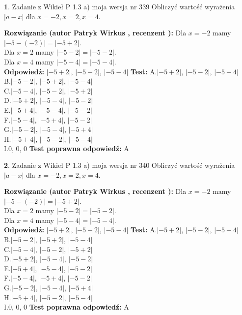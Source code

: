 \documentclass[12pt, a4paper]{article}
\theoremstyle{definition} %
\newtheorem{zad}{}
\newcommand{\zadStart}[1]{\begin{zad}#1\newline}
\newcommand{\zadStop}{\end{zad}}
\newcommand{\rozwStart}[2]{\noindent \textbf{Rozwiązanie (autor #1 , recenzent #2): }\newline}
\newcommand{\rozwStop}{\newline}
\newcommand{\odpStart}{\noindent \textbf{Odpowiedź:}\newline}
\newcommand{\odpStop}{\newline}
\newcommand{\testStart}{\noindent \textbf{Test:}\newline}
\newcommand{\testStop}{\newline}
\newcommand{\kluczStart}{\noindent \textbf{Test poprawna odpowiedź:}\newline}
\newcommand{\kluczStop}{\newline}
\begin{document}
\zadStart{Zadanie z Wikieł P 1.3 a) moja wersja nr 339}
Obliczyć wartość wyrażenia $|a - x|$ dla $x=-2,x=2,x=4$.
\zadStop
\rozwStart{Patryk Wirkus}{}
Dla $x = -2$ mamy $|-5 - (-2)| = |-5 + 2|$.\\
Dla $x = 2$ mamy $|-5 - 2| = |-5 - 2|$.\\
Dla $x = 4$ mamy $|-5 - 4| = |-5 - 4|$.\\
\rozwStop
\odpStart
$|-5 + 2|$, $|-5 - 2|$, $|-5 - 4|$
\odpStop
\testStart
A.$|-5 + 2|$, $|-5 - 2|$, $|-5 - 4|$\\
B.$|-5 - 2|$, $|-5 + 2|$, $|-5 - 4|$\\
C.$|-5 - 4|$, $|-5 - 2|$, $|-5 + 2|$\\
D.$|-5 + 2|$, $|-5 - 4|$, $|-5 - 2|$\\
E.$|-5 + 4|$, $|-5 - 4|$, $|-5 - 2|$\\
F.$|-5 - 4|$, $|-5 + 4|$, $|-5 - 2|$\\
G.$|-5 - 2|$, $|-5 - 4|$, $|-5 + 4|$\\
H.$|-5 + 4|$, $|-5 - 2|$, $|-5 - 4|$\\
I.$0$, $0$, $0$
\testStop
\kluczStart
A
\kluczStop



\zadStart{Zadanie z Wikieł P 1.3 a) moja wersja nr 340}
Obliczyć wartość wyrażenia $|a - x|$ dla $x=-2,x=2,x=4$.
\zadStop
\rozwStart{Patryk Wirkus}{}
Dla $x = -2$ mamy $|-5 - (-2)| = |-5 + 2|$.\\
Dla $x = 2$ mamy $|-5 - 2| = |-5 - 2|$.\\
Dla $x = 4$ mamy $|-5 - 4| = |-5 - 4|$.\\
\rozwStop
\odpStart
$|-5 + 2|$, $|-5 - 2|$, $|-5 - 4|$
\odpStop
\testStart
A.$|-5 + 2|$, $|-5 - 2|$, $|-5 - 4|$\\
B.$|-5 - 2|$, $|-5 + 2|$, $|-5 - 4|$\\
C.$|-5 - 4|$, $|-5 - 2|$, $|-5 + 2|$\\
D.$|-5 + 2|$, $|-5 - 4|$, $|-5 - 2|$\\
E.$|-5 + 4|$, $|-5 - 4|$, $|-5 - 2|$\\
F.$|-5 - 4|$, $|-5 + 4|$, $|-5 - 2|$\\
G.$|-5 - 2|$, $|-5 - 4|$, $|-5 + 4|$\\
H.$|-5 + 4|$, $|-5 - 2|$, $|-5 - 4|$\\
I.$0$, $0$, $0$
\testStop
\kluczStart
A
\kluczStop
\end{document}
